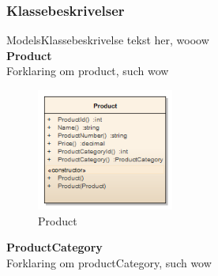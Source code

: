 \subsubsection{Klassebeskrivelser}
ModelsKlassebeskrivelse tekst her, wooow\\


\textbf{Product}\\
Forklaring om product, such wow


\begin{figure}[H]
    \centering
    \includegraphics[width=0.4\textwidth]{Systemdesign/SharedLib/Images/Klasser/Model/Product.png}
    \caption{Product}
    \label{fig:klasseModelPrd}
\end{figure}

\textbf{ProductCategory}\\
Forklaring om productCategory, such wow